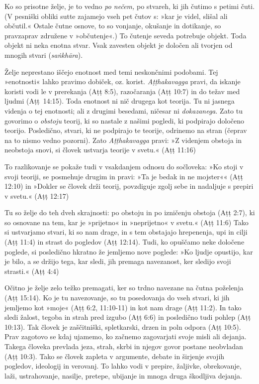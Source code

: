 Ko so
prisotne želje, je to vedno \emph{po nečem,} po stvareh, ki jih čutimo s
petimi čuti. (V pesniški obliki sutte zajamejo vseh pet čutov s: »kar je
videl, slišal ali občutil.« Ostale čutne osnove, to so vonjanje,
okušanje in dotikanje, so pravzaprav združene v »občutenje«.) To čutenje
seveda potrebuje objekt. Toda objekt ni neka enotna stvar. Vsak zavesten
objekt je določen ali tvorjen od mnogih stvari (\emph{saṅkhāra}). 

Želje
neprestano iščejo enotnost med temi neskončnimi podobami. Tej
»enotnosti« lahko pravimo dobiček, oz. korist. \emph{Aṭṭhakavagga}
pravi, da iskanje koristi vodi le v prerekanja (Aṭṭ 8:5), razočaranja
(Aṭṭ 10:7) in do težav med ljudmi (Aṭṭ~14:15). Toda enotnost ni nič
drugega kot teorija. Tu ni jasnega videnja o tej enotnosti; ali z
drugimi besedami, ničesar ni \emph{dokazanega}. Zato tu govorimo o
\emph{obstoju} teorij, ki so nastale z našimi pogledi, ki podpirajo
določeno teorijo. Posledično, stvari, ki ne podpirajo te teorije,
odrinemo na stran (čeprav na to nismo vedno pozorni). Zato
\emph{Aṭṭhakavagga} pravi: »Z videnjem obstoja in neobstoja snovi, si
človek ustvarja teorije v svetu.« (Aṭṭ 11:16) 

To razlikovanje se pokaže
tudi v vsakdanjem odnosu do sočloveka: »Ko stoji v svoji teoriji, se
posmehuje drugim in pravi: »Ta je bedak in ne mojster«« (Aṭṭ 12:10) in
»Dokler se človek drži teorij, povzdiguje zgolj sebe in nadaljuje s
prepiri v svetu.« (Aṭṭ 12:17) 

Tu so želje do teh dveh skrajnosti: po
obstoju in po izničenju obstoja (Aṭṭ 2:7), ki so osnovane na tem, kar je
»prijetno« in »neprijetno« v svetu.« (Aṭṭ 11:6) Tako si ustvarjamo
stvari, ki so nam drage, in s tem obstajajo hrepenenja, upi in cilji
(Aṭṭ 11:4) in strast do pogledov (Aṭṭ 12:14). Tudi, ko opuščamo neke
določene poglede, si posledično hkratno že jemljemo nove poglede: »Ko
ljudje opustijo, kar je bilo, a se držijo tega, kar sledi, jih premaga
navezanost, ker sledijo svoji strasti.« (Aṭṭ 4:4) 

Očitno je želje zelo
težko premagati, ker so trdno navezane na čutna poželenja (Aṭṭ 15:14).
Ko je tu navezovanje, so tu posedovanja do vseh stvari, ki jih jemljemo
kot »moje« (Aṭṭ 6:2, 11:10-11) in kot nam drage (Aṭṭ 11:2). In tako
sledi žalost, tegoba in strah pred izgubo (Aṭṭ 6:6) in posledično tudi
pohlep (Aṭṭ 10:13). Tak človek je zaščitniški, spletkarski, drzen in
poln odpora (Aṭṭ 10:5). Prav zagotovo se kdaj ujamemo, ko začnemo
zagovarjati svoje misli ali dejanja. Takega človeka prevlada jeza,
strah, skrbi in njegov govor postane neobvladan (Aṭṭ 10:3). Tako se
človek zapleta v argumente, debate in širjenje svojih pogledov,
ideologij in verovanj. To lahko vodi v prepire, žaljivke, obrekovanje,
laži, ustrahovanje, nasilje, pretepe, ubijanje in mnoga druga škodljiva
dejanja.

